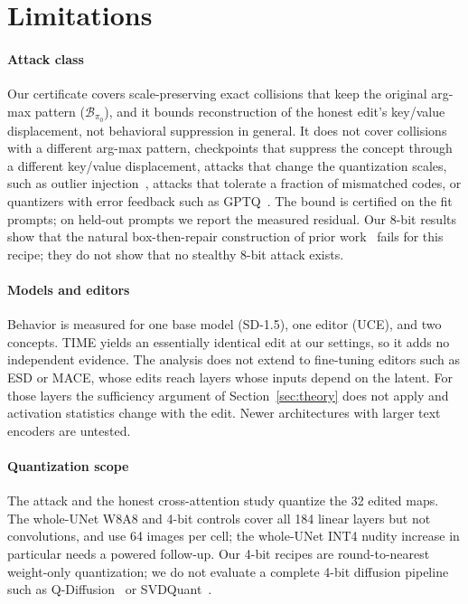 \section{Limitations}
\label{sec:limits}
\paragraph{Attack class}
Our certificate covers scale-preserving exact collisions that keep the original
arg-max pattern ($\mathcal{B}_{\pi_0}$), and it bounds reconstruction of the honest
edit's key/value displacement, not behavioral suppression in general. It does not
cover collisions with a different arg-max pattern, checkpoints that suppress the
concept through a different key/value displacement, attacks that change the
quantization scales, such as outlier injection~\cite{zhan2026}, attacks that tolerate
a fraction of mismatched codes, or quantizers with error feedback such as
GPTQ~\cite{gptq}. The bound is certified on the fit prompts; on held-out prompts we
report the measured residual. Our 8-bit results show that the natural
box-then-repair construction of prior work~\cite{egashira2024,egashira2025} fails
for this recipe; they do not show that no stealthy 8-bit attack exists.

\paragraph{Models and editors}
Behavior is measured for one base model (SD-1.5), one editor (UCE), and two concepts.
TIME yields an essentially identical edit at our settings, so it adds no independent
evidence. The analysis does not extend to fine-tuning editors such as ESD or MACE,
whose edits reach layers whose inputs depend on the latent. For those layers the sufficiency argument of
Section~\ref{sec:theory} does not apply and activation statistics change with the
edit. Newer architectures with larger text encoders are untested.

\paragraph{Quantization scope}
The attack and the honest cross-attention study quantize the 32 edited maps. The
whole-UNet W8A8 and 4-bit controls cover all 184 linear layers but not convolutions,
and use 64 images per cell; the whole-UNet INT4 nudity increase in particular needs a
powered follow-up. Our 4-bit recipes are round-to-nearest weight-only quantization;
we do not evaluate a complete 4-bit diffusion pipeline such as
Q-Diffusion~\cite{qdiffusion} or SVDQuant~\cite{svdquant}.

